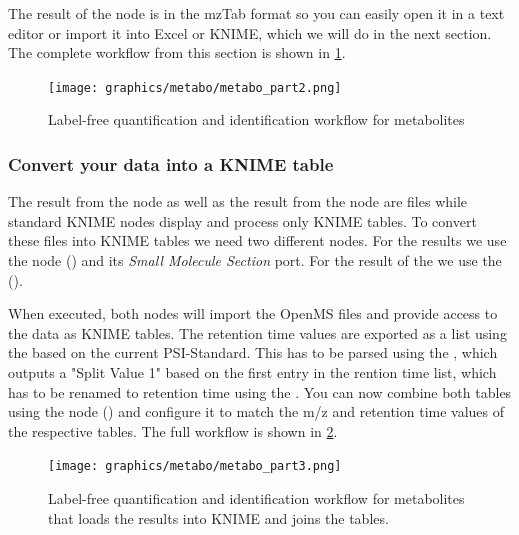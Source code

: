 The result of the  node is in the mzTab format \cite{Griss2014} so you can easily open it in a text editor or import it into Excel or KNIME, which we will do in the next section.
The complete workflow from this section is shown in \cref{fig:metabo_part2}.

\begin{figure}[htbp]
  \centering
  \texttt{[image: graphics/metabo/metabo\_part2.png]}
  \caption{Label-free quantification and identification workflow for metabolites}
  \label{fig:metabo_part2}
\end{figure}

\subsubsection{Convert your data into a KNIME table}

The result from the  node as well as the result from the  node are files while standard KNIME nodes display and process only KNIME tables. To convert these files into KNIME tables we need two different nodes.
For the  results we use the  node () and its \textit{Small Molecule Section} port. For the result of the  we use the  ().

When executed, both nodes will import the OpenMS files and provide access to the data as KNIME tables. The retention time values are exported as a list using the  based on the current PSI-Standard. This has to be parsed using the , which outputs a "Split Value 1" based on the first entry in the rention time list, which has to be renamed to retention time using the . You can now combine both tables using the  node () and configure it to match the m/z and retention time values of the respective tables. The full workflow is shown in \cref{fig:metabo_part3}.

\begin{figure}[htbp]
  \centering
  \texttt{[image: graphics/metabo/metabo\_part3.png]}
  \caption{Label-free quantification and identification workflow for metabolites that loads the results into KNIME and joins the tables.}
  \label{fig:metabo_part3}
\end{figure}

